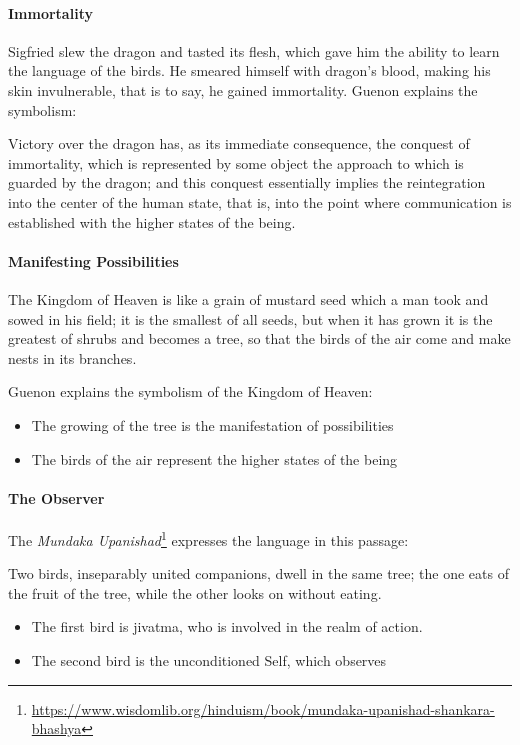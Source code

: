 \paragraph{Immortality}
Sigfried slew the dragon and tasted its flesh, which gave him the ability to learn the language of the birds. He smeared himself with dragon's blood, making his skin invulnerable, that is to say, he gained immortality. Guenon explains the symbolism:

\begin{quotex}
Victory over the dragon has, as its immediate consequence, the conquest of immortality, which is represented by some object the approach to which is guarded by the dragon; and this conquest essentially implies the reintegration into the center of the human state, that is, into the point where communication is established with the higher states of the being. 

\end{quotex}
\paragraph{Manifesting Possibilities}
\begin{quotex}
The Kingdom of Heaven is like a grain of mustard seed which a man took and sowed in his field; it is the smallest of all seeds, but when it has grown it is the greatest of shrubs and becomes a tree, so that the birds of the air come and make nests in its branches. 

\end{quotex}
Guenon explains the symbolism of the Kingdom of Heaven:

\begin{itemize}
\item The growing of the tree is the manifestation of possibilities 
\item The birds of the air represent the higher states of the being 
\end{itemize}
\paragraph{The Observer}
The \textit{Mundaka Upanishad}\footnote{\url{https://www.wisdomlib.org/hinduism/book/mundaka-upanishad-shankara-bhashya}} expresses the language in this passage:

\begin{quotex}
Two birds, inseparably united companions, dwell in the same tree; the one eats of the fruit of the tree, while the other looks on without eating. 

\end{quotex}
\begin{itemize}
\item The first bird is jivatma, who is involved in the realm of action. 
\item The second bird is the unconditioned Self, which observes 
\end{itemize}
